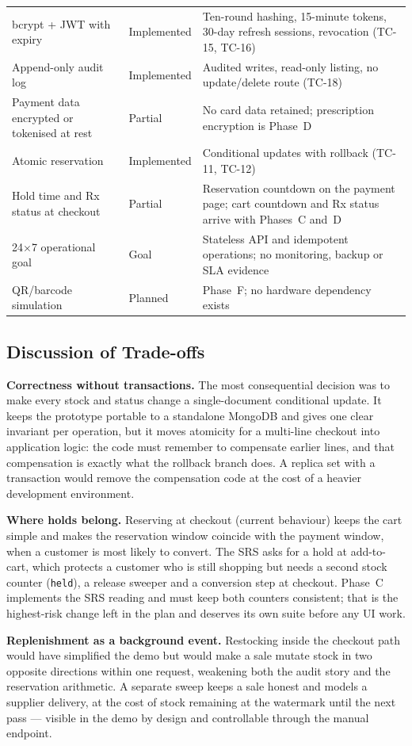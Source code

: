 \documentclass[11pt,a4paper]{article}
\begin{document}
{\begin{longtable}{@{}L{4.30cm}L{1.90cm}L{9.24cm}@{}}
bcrypt + JWT with expiry & Implemented & Ten-round hashing, 15-minute tokens, 30-day refresh sessions, revocation (TC-15, TC-16)\\
Append-only audit log & Implemented & Audited writes, read-only listing, no update/delete route (TC-18)\\
Payment data encrypted or tokenised at rest & Partial & No card data retained; prescription encryption is Phase~D\\
Atomic reservation & Implemented & Conditional updates with rollback (TC-11, TC-12)\\
Hold time and Rx status at checkout & Partial & Reservation countdown on the payment page; cart countdown and Rx status arrive with Phases~C and~D\\
24$\times$7 operational goal & Goal & Stateless API and idempotent operations; no monitoring, backup or SLA evidence\\
QR/barcode simulation & Planned & Phase~F; no hardware dependency exists\\
\end{longtable}
}

\subsection{Discussion of Trade-offs}
\textbf{Correctness without transactions.} The most consequential decision was to make
every stock and status change a single-document conditional update. It keeps the
prototype portable to a standalone MongoDB and gives one clear invariant per operation,
but it moves atomicity for a multi-line checkout into application logic: the code must
remember to compensate earlier lines, and that compensation is exactly what the rollback
branch does. A replica set with a transaction would remove the compensation code at the
cost of a heavier development environment.

\textbf{Where holds belong.} Reserving at checkout (current behaviour) keeps the cart
simple and makes the reservation window coincide with the payment window, when a
customer is most likely to convert. The SRS asks for a hold at add-to-cart, which
protects a customer who is still shopping but needs a second stock counter
(\texttt{held}), a release sweeper and a conversion step at checkout. Phase~C implements
the SRS reading and must keep both counters consistent; that is the highest-risk change
left in the plan and deserves its own suite before any UI work.

\textbf{Replenishment as a background event.} Restocking inside the checkout path would
have simplified the demo but would make a sale mutate stock in two opposite directions
within one request, weakening both the audit story and the reservation arithmetic. A
separate sweep keeps a sale honest and models a supplier delivery, at the cost of stock
remaining at the watermark until the next pass --- visible in the demo by design and
controllable through the manual endpoint.
\end{document}

